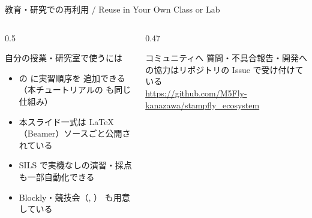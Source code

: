 \begin{frame}{教育・研究での再利用 / Reuse in Your Own Class or Lab}
  \begin{columns}[T]
    \begin{column}{0.5\textwidth}
      \begin{block}{自分の授業・研究室で使うには}\footnotesize
        \begin{itemize}
          \setlength{\itemsep}{1pt}
          \item {} の  に実習順序を
                追加できる（本チュートリアルの  も同じ仕組み）
          \item 本スライド一式は LaTeX（Beamer）ソースごと公開されている
          \item SILS で実機なしの演習・採点も一部自動化できる
          \item Blockly・競技会（, ）
                も用意している
        \end{itemize}
      \end{block}
    \end{column}
    \begin{column}{0.47\textwidth}
      \begin{exampleblock}{コミュニティへ}\footnotesize
        質問・不具合報告・開発への協力はリポジトリの Issue で受け付けている\\[4pt]
        \url{https://github.com/M5Fly-kanazawa/stampfly_ecosystem}
      \end{exampleblock}
    \end{column}
  \end{columns}
\end{frame}

